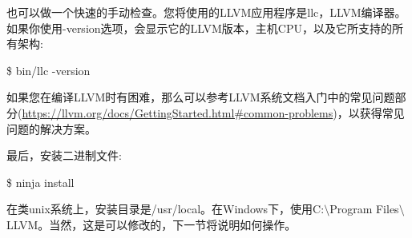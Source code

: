 也可以做一个快速的手动检查。您将使用的LLVM应用程序是llc，LLVM编译器。如果你使用-version选项，会显示它的LLVM版本，主机CPU，以及它所支持的所有架构:\par

\begin{tcolorbox}[colback=white,colframe=black]
	\$ bin/llc -version
\end{tcolorbox}

如果您在编译LLVM时有困难，那么可以参考LLVM系统文档入门中的常见问题部分(\url{https://llvm.org/docs/GettingStarted.html\#common-problems})，以获得常见问题的解决方案。\par

最后，安装二进制文件:\par

\begin{tcolorbox}[colback=white,colframe=black]
	\$ ninja install
\end{tcolorbox}

在类unix系统上，安装目录是/usr/local。在Windows下，使用C:$\setminus$Program Files$\setminus$LLVM。当然，这是可以修改的，下一节将说明如何操作。\par






